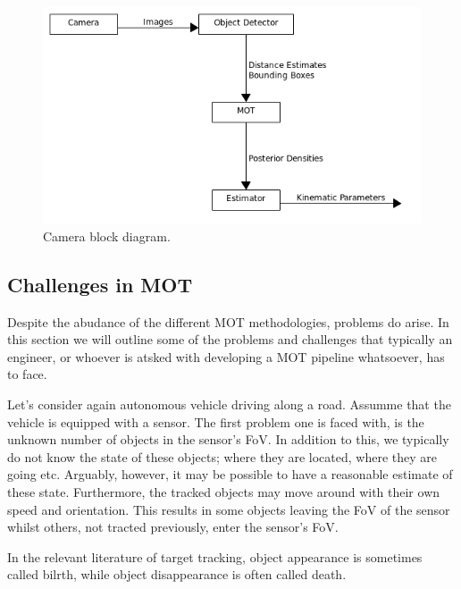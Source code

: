 \begin{figure}[!htb]
\begin{center}
\includegraphics[scale=0.480]{img/object_tracking/camera_block_diagram.png}
\end{center}
\caption{Camera block diagram.}
\label{camera_block_diagram}
\end{figure}


\subsection{Challenges in MOT}
\label{challenges_mot}

Despite the abudance of the different MOT methodologies, problems do arise. In this section we will outline some of the problems
and challenges that typically an engineer, or whoever is atsked with developing a MOT pipeline whatsoever, has to face.

Let's consider again autonomous vehicle driving along a road.  Assumme that the vehicle is equipped with a sensor. 
The first problem one is faced with, is the unknown number of objects in the sensor's FoV. In addition to this, we typically do not
know the state of these objects; where they are located, where they are going etc. Arguably, however, it may be possible to 
have a reasonable estimate of these state. Furthermore, the tracked objects may move around with their own speed and orientation. This results
in some objects leaving the FoV of the sensor whilst others, not tracted previously, enter the sensor's FoV.

\begin{framed}
\begin{remark}{}

In the relevant literature of target tracking, object appearance is sometimes called bilrth, while object disappearance
is often called death. 
\end{remark}
\end{framed}

